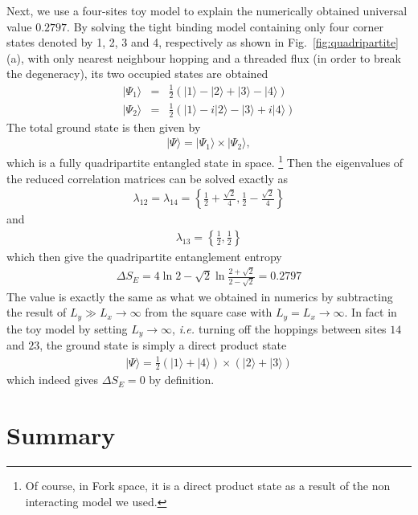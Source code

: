 \documentclass[doublecol]{epl2} %
\newcommand{\ie}{\textit{i.e.{ }}}
\begin{document}
Next, we use a four-sites toy model to explain the numerically obtained universal value $0.2797$. By solving the tight binding model containing only four corner states denoted by 1, 2, 3 and 4, respectively as shown in Fig.~\ref{fig:quadripartite}(a), with only nearest neighbour hopping and a threaded flux (in order to break the degeneracy), \cite{Benalcazar_S_2017} its two occupied states are obtained 
\begin{eqnarray}
|\Psi_1\rangle&=&\frac12\left(|1\rangle-|2\rangle+|3\rangle-|4\rangle\right) \nonumber\\
|\Psi_2\rangle&=&\frac12\left(|1\rangle-i|2\rangle-|3\rangle+i|4\rangle\right) \nonumber
\end{eqnarray}
The total ground state is then given by
\begin{eqnarray}
|\Psi\rangle=|\Psi_1\rangle \times |\Psi_2\rangle,
\end{eqnarray}
which is a fully quadripartite entangled state in space. \footnote{Of course, in Fork space, it is a direct product state as a result of the non interacting model we used.} Then the eigenvalues of the reduced correlation matrices can be solved exactly as
\begin{eqnarray}
\lambda_{12}=\lambda_{14}=\left\{\frac{1}{2}+\frac{\sqrt{2}}{4},\frac{1}{2}-\frac{\sqrt{2}}{4}\right\} \nonumber
\end{eqnarray}
and
\begin{eqnarray}
\lambda_{13}=\left\{\frac{1}{2},\frac{1}{2}\right\} \nonumber
\end{eqnarray}
which then give the quadripartite entanglement entropy
\begin{eqnarray}
\Delta S_E= 4\ln2-\sqrt{2}\ln\frac{2+\sqrt{2}}{2-\sqrt{2}}=0.2797
\end{eqnarray}
The value is exactly the same as what we obtained in numerics by subtracting the result of $L_y\gg L_x\rightarrow\infty$ from the square case with $L_y=L_x\rightarrow\infty$. In fact in the toy model by setting $L_y\rightarrow\infty$, \ie turning off the hoppings between sites $14$ and
$23$, the ground state is simply a direct product state
\begin{eqnarray}
|\Psi\rangle=\frac12 \left(|1\rangle+|4\rangle\right) \times \left(|2\rangle+|3\rangle\right)
\end{eqnarray}
which indeed gives $\Delta S_E=0$ by definition. 

\section{Summary}
\end{document}
